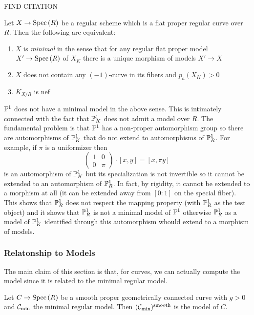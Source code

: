 \documentclass[12pt]{article}
\begin{document}
{\color{red} FIND CITATION}

\begin{lemma}
Let $X \to \Spec{R}$ be a regular scheme which is a flat proper regular curve over $R$. Then the following are equivalent:
\begin{enumerate}
\item $X$ is \textit{minimal} in the sense that for any regular flat proper model $X' \to \Spec{R}$ of $X_K$ there is a unique morphism of models $X' \to X$
\item $X$ does not contain any $(-1)$-curve in its fibers and $p_a(X_K) > 0$
\item $K_{X/R}$ is nef 
\end{enumerate} 
\end{lemma}

\begin{rmk}
$\P^1$ does not have a minimal model in the above sense. This is intimately connected with the fact that $\P^1_K$ does not admit a \Neron model over $R$. The fundamental problem is that $\P^1$ has a non-proper automorphism group so there are automorphisms of $\P^1_K$ that do not extend to automorphisms of $\P^1_R$. For example, if $\pi$ is a uniformizer then 
\[ \begin{pmatrix}
1 & 0
\\
0 & \pi
\end{pmatrix} \cdot [x,y] = [x, \pi y] \]
is an automorphism of $\P^1_K$ but its specialization is not invertible so it cannot be extended to an automorphism of $\P^1_R$. In fact, by rigidity, it cannot be extended to a morphism at all (it can be extended away from $[0:1]$ on the special fiber). This shows that $\P^1_R$ does not respect the \Neron mapping property (with $\P^1_R$ as the test object) and it shows that $\P^1_R$ is not a minimal model of $\P^1$ otherwise $\P^1_R$ as a model of $\P^1_K$ identified through this automorphism whould extend to a morphism of models. 
\end{rmk}

\subsubsection{Relatonship to \Neron Models}

The main claim of this section is that, for curves, we can actually compute the \Neron model since it is related to the minimal regular model.

\begin{thm}
Let $C \to \Spec{R}$ be a smooth proper geometrically connected curve with $g > 0$ and $\C_{\min}$ the minimal regular model. Then $(\C_{\min})^{\text{smooth}}$ is the \Neron model of $C$.
\end{thm}
\end{document}
